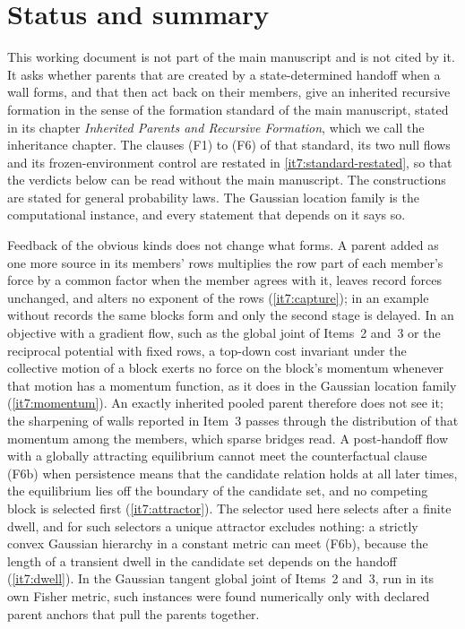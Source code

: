 \documentclass[11pt,letterpaper]{report}
\begin{document}
\hypersetup{pageanchor=false}
\hypersetup{pageanchor=true}
\chapter*{Status and summary}
This working document is not part of the main manuscript and is not cited by it. It asks whether parents that are created by a state-determined handoff when a wall forms, and that then act back on their members, give an inherited recursive formation in the sense of the formation standard of the main manuscript, stated in its chapter \emph{Inherited Parents and Recursive Formation}, which we call the inheritance chapter. The clauses (F1) to (F6) of that standard, its two null flows and its frozen-environment control are restated in \cref{it7:standard-restated}, so that the verdicts below can be read without the main manuscript. The constructions are stated for general probability laws. The Gaussian location family is the computational instance, and every statement that depends on it says so.

Feedback of the obvious kinds does not change what forms. A parent added as one more source in its members' rows multiplies the row part of each member's force by a common factor when the member agrees with it, leaves record forces unchanged, and alters no exponent of the rows (\cref{it7:capture}); in an example without records the same blocks form and only the second stage is delayed. In an objective with a gradient flow, such as the global joint of Items~2 and~3 or the reciprocal potential with fixed rows, a top-down cost invariant under the collective motion of a block exerts no force on the block's momentum whenever that motion has a momentum function, as it does in the Gaussian location family (\cref{it7:momentum}). An exactly inherited pooled parent therefore does not see it; the sharpening of walls reported in Item~3 passes through the distribution of that momentum among the members, which sparse bridges read. A post-handoff flow with a globally attracting equilibrium cannot meet the counterfactual clause (F6b) when persistence means that the candidate relation holds at all later times, the equilibrium lies off the boundary of the candidate set, and no competing block is selected first (\cref{it7:attractor}). The selector used here selects after a finite dwell, and for such selectors a unique attractor excludes nothing: a strictly convex Gaussian hierarchy in a constant metric can meet (F6b), because the length of a transient dwell in the candidate set depends on the handoff (\cref{it7:dwell}). In the Gaussian tangent global joint of Items~2 and~3, run in its own Fisher metric, such instances were found numerically only with declared parent anchors that pull the parents together.
\end{document}
